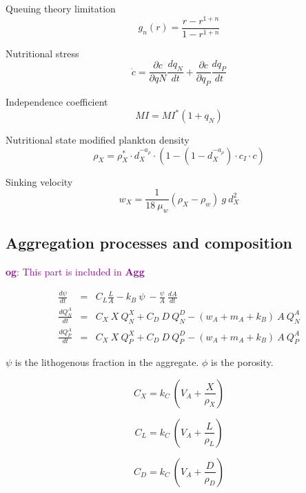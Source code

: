 \documentclass[fleqn]{article}                     %
\newcommand{\comment}[3][darkmagenta]{\textcolor{#1}{\textbf{#2}: #3}}
\begin{document}
Queuing theory limitation
\begin{equation}
  g_n(r) = \frac{r - r^{1+n}}{1 - r^{1+n}}
\end{equation}

Nutritional stress
\begin{equation}
  \dot{c} = \frac{\partial c}{\partial qN}\frac{dq_N}{dt}+\frac{\partial c}{\partial q_P}\frac{dq_P}{dt}
\end{equation}

Independence coefficient
\begin{equation}
  MI = MI^*(1+q_N)
\end{equation}

Nutritional state modified plankton density
\begin{equation}
  \rho_X = \rho^*_X\cdot d_X^{-a_\rho}\cdot(1-(1-d_X^{-a_\rho})\cdot c_I\cdot  c)
\end{equation}

Sinking velocity
\begin{equation}
  w_X = \frac{1}{18\ \mu_w} (\rho_X-\rho_w)\ g\ d_X^2
\end{equation}

\subsection{Aggregation processes and composition}
\comment{og}{This part is included in \textbf{Agg}}

\begin{eqnarray}
  \frac{d\psi}{dt} &=& C_L \frac{L}{A} - k_B\ \psi\ -\frac{\psi}{A}\ \frac{dA}{dt} \\
  \frac{dQ^A_N}{dt} &=& C_X\ X\ Q^X_N +  C_D\ D\ Q^D_N -(w_A+m_A+k_B)\ A\ Q^A_N\\
  \frac{dQ^A_P}{dt} &=& C_X\ X\ Q^X_P +  C_D\ D\ Q^D_P -(w_A+m_A+k_B)\ A\ Q^A_P
\end{eqnarray}

$\psi$ is the lithogenous fraction in the aggregate.
$\phi$ is the porosity.

\begin{equation}
  C_X = k_C\ \left(V_A+\frac{X}{\rho_X}\right)
\end{equation}

\begin{equation}
  C_L = k_C\ \left(V_A+\frac{L}{\rho_L}\right)
\end{equation}

\begin{equation}
  C_D = k_C\ \left(V_A+\frac{D}{\rho_D}\right)
\end{equation}
\end{document}
